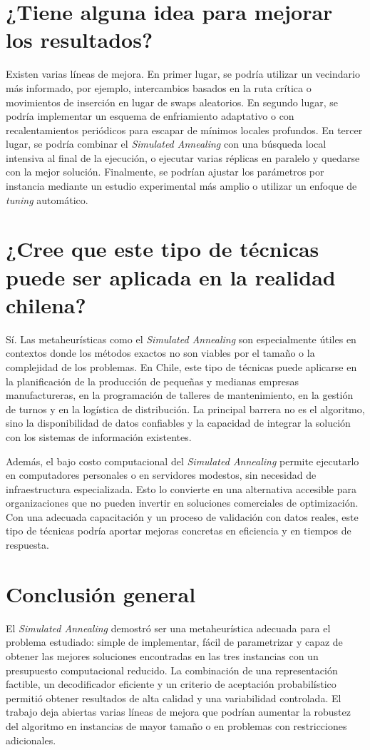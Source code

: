 \section{¿Tiene alguna idea para mejorar los resultados?}

Existen varias líneas de mejora.
En primer lugar, se podría utilizar un vecindario más informado, por ejemplo,
intercambios basados en la ruta crítica o movimientos de inserción en lugar de swaps aleatorios.
En segundo lugar, se podría implementar un esquema de enfriamiento adaptativo o
con recalentamientos periódicos para escapar de mínimos locales profundos.
En tercer lugar, se podría combinar el \emph{Simulated Annealing} con una búsqueda local intensiva al final de la ejecución,
o ejecutar varias réplicas en paralelo y quedarse con la mejor solución.
Finalmente, se podrían ajustar los parámetros por instancia mediante un
estudio experimental más amplio o utilizar un enfoque de \emph{tuning} automático.

\section{¿Cree que este tipo de técnicas puede ser aplicada en la realidad chilena?}

Sí. Las metaheurísticas como el \emph{Simulated Annealing} son especialmente útiles en
contextos donde los métodos exactos no son viables por el tamaño o la complejidad de los problemas.
En Chile, este tipo de técnicas puede aplicarse en la planificación de la producción de
pequeñas y medianas empresas manufactureras,
en la programación de talleres de mantenimiento,
en la gestión de turnos y en la logística de distribución.
La principal barrera no es el algoritmo,
sino la disponibilidad de datos confiables y la capacidad de integrar la solución con los sistemas de información existentes.

Además, el bajo costo computacional del \emph{Simulated Annealing} permite ejecutarlo en
computadores personales o en servidores modestos, sin necesidad de infraestructura especializada.
Esto lo convierte en una alternativa accesible para organizaciones
que no pueden invertir en soluciones comerciales de optimización.
Con una adecuada capacitación y un proceso de validación con datos reales,
este tipo de técnicas podría aportar mejoras concretas en eficiencia y en tiempos de respuesta.

\section{Conclusión general}

El \emph{Simulated Annealing} demostró ser una metaheurística adecuada para el problema estudiado:
simple de implementar, fácil de parametrizar y capaz de obtener
las mejores soluciones encontradas en las tres instancias con un presupuesto computacional reducido.
La combinación de una representación factible,
un decodificador eficiente y un criterio de aceptación probabilístico
permitió obtener resultados de alta calidad y una variabilidad controlada.
El trabajo deja abiertas varias líneas de mejora que podrían aumentar la
robustez del algoritmo en instancias de mayor tamaño o en problemas con restricciones adicionales.
